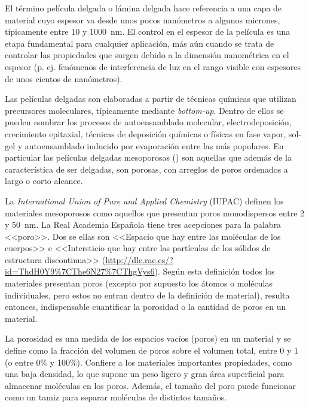 	 El término película delgada o lámina delgada hace referencia a una capa de material cuyo espesor va desde unos pocos nanómetros a algunos micrones, típicamente entre 10 y \SI{1000}{\nm}. El control en el espesor de la película es una etapa fundamental para cualquier aplicación, más aún cuando se trata de controlar las propiedades que surgen debido a la dimensión nanométrica en el espesor (p. ej. fenómenos de interferencia de luz en el rango visible con espesores de unos cientos de nanómetros). 

     Las películas delgadas son elaboradas a partir de técnicas químicas que utilizan precursores moleculares, típicamente mediante \textit{bottom-up}. Dentro de ellos se pueden nombrar los procesos de autoensamblado molecular, electrodeposición, crecimiento epitaxial, técnicas de deposición químicas o físicas en fase vapor, sol-gel y autoensamblado inducido por evaporación entre las más populares. En particular las películas delgadas mesoporosas (\pdm) son aquellas que además de la característica de ser delgadas, son porosas, con arreglos de poros ordenados a largo o corto alcance.\cite{Brinker1990,Lu1997,Innocenzi2013}

	 La \textit{International Union of Pure and Applied Chemistry} (IUPAC) definen los materiales mesoporosos como aquellos que presentan poros monodispersos entre 2 y \SI{50}{\nm}. La Real Academia Española tiene tres acepciones para la palabra <<poro>>. Dos se ellas son <<Espacio que hay entre las moléculas de los cuerpos>> e <<Intersticio que hay entre las partículas de los sólidos de estructura discontinua>> (\url{http://dle.rae.es/?id=ThdH0Y9%7CThe6N27%7CThgVys6}). Según esta definición todos los materiales presentan poros (excepto por supuesto los átomos o moléculas individuales, pero estos no entran dentro de la definición de material), resulta entonces, indispensable cuantificar la porosidad\index{porosidad} o la cantidad de poros en un material.

	 \pagebreak La porosidad es una medida de los espacios vacíos (poros) en un material y se define como la fracción del volumen de poros sobre el volumen total, entre 0 y 1 (o entre 0\% y 100\%).\cite{iupac-1994} Confiere a los materiales importantes propiedades, como una baja densidad, lo que supone un peso ligero y gran área superficial para almacenar moléculas en los poros. Además, el tamaño del poro puede funcionar como un tamiz para separar moléculas de distintos tamaños.\cite{Martin2004} 

